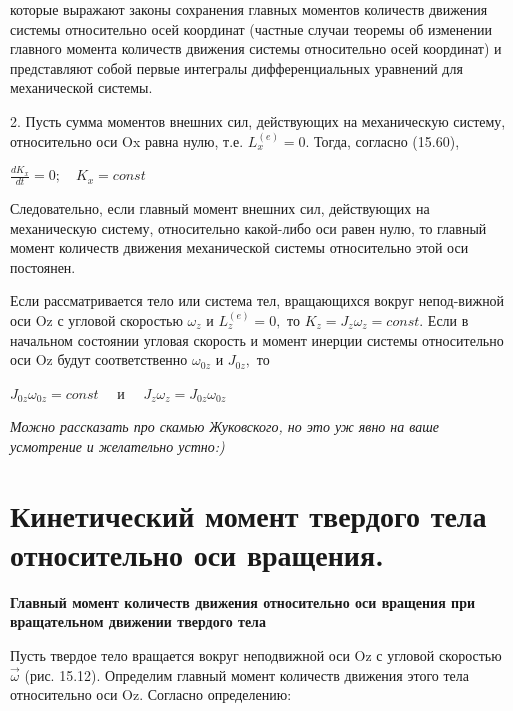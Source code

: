 {\begin{center}
    \par которые выражают законы сохранения главных моментов количеств движения системы относительно осей координат (частные случаи теоремы об изменении главного момента количеств движения системы относительно осей координат)  и  представляют  собой  первые  интегралы  дифференциальных уравнений для механической системы.

    \par {2.} Пусть сумма моментов внешних сил, действующих  на механическую систему, относительно оси Ox равна нулю, т.е. ${L}_{x}^{(e)}=0.$ Тогда, согласно (15.60),

    \par $\frac{d{K}_{x}}{dt}=0; \quad K_{x}=const$

    \par Следовательно, если главный момент внешних сил, действующих на механическую систему, относительно какой-либо оси равен нулю, то главный момент количеств движения механической системы относительно этой оси постоянен.

    \par Если рассматривается тело или система тел, вращающихся вокруг непод-вижной оси Oz с угловой скоростью $\omega_z$ и ${L}_{z}^{(e)}=0,$ то $K_z=J_z\omega_z=const.$ Если в начальном состоянии угловая скорость и момент инерции системы относительно оси Oz будут соответственно $\omega_{0z}$ и $J_{0z},$ то

    \par $J_{0z}\omega_{0z}=const\quad$ и $\quad J_{z}\omega_{z}=J_{0z}\omega_{0z}$

    \par \textit{Можно рассказать про скамью Жуковского, но это уж явно на ваше усмотрение и желательно устно:)}
\end{center}
\section{Кинетический момент твердого тела относительно оси вращения.}
\begin{center}
    \par \textbf{Главный момент количеств движения относительно оси  вращения при вращательном движении твердого тела}

    \par Пусть твердое тело вращается вокруг неподвижной оси Oz с угловой скоростью $\vec{\omega}$ (рис. 15.12). Определим главный момент количеств движения этого тела относительно оси Oz. Согласно определению:


\end{center}}
